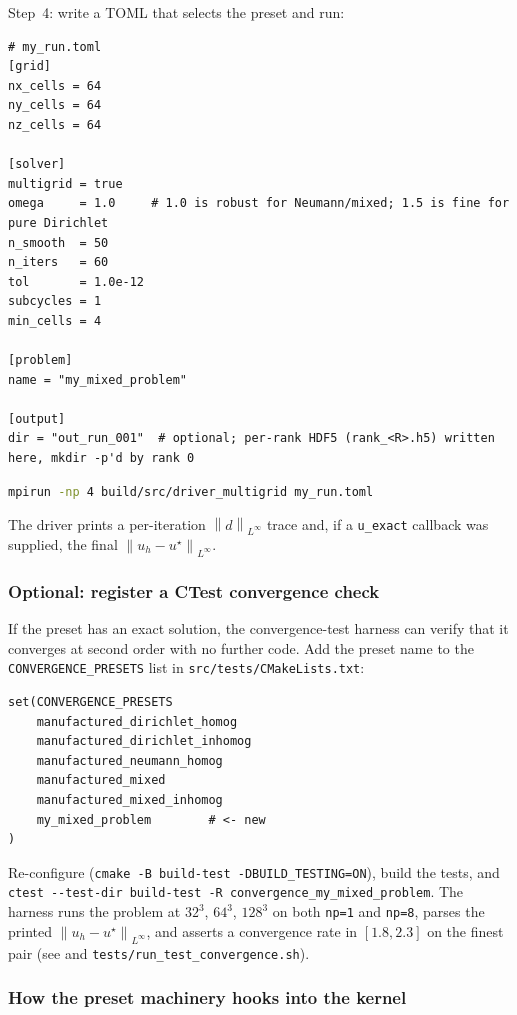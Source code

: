 \documentclass[11pt]{article}
\theoremstyle{definition}
\newcommand{\norm}[1]{\left\lVert #1 \right\rVert}
\newcommand{\Linf}{L^{\infty}}
\begin{document}
Step~4: write a TOML that selects the preset and run:
\begin{lstlisting}[language={}]
# my_run.toml
[grid]
nx_cells = 64
ny_cells = 64
nz_cells = 64

[solver]
multigrid = true
omega     = 1.0     # 1.0 is robust for Neumann/mixed; 1.5 is fine for pure Dirichlet
n_smooth  = 50
n_iters   = 60
tol       = 1.0e-12
subcycles = 1
min_cells = 4

[problem]
name = "my_mixed_problem"

[output]
dir = "out_run_001"  # optional; per-rank HDF5 (rank_<R>.h5) written here, mkdir -p'd by rank 0
\end{lstlisting}
\begin{lstlisting}[language=bash]
mpirun -np 4 build/src/driver_multigrid my_run.toml
\end{lstlisting}
The driver prints a per-iteration $\norm{d}_{\Linf}$ trace and, if a
\texttt{u\_exact} callback was supplied, the final
$\norm{u_{h} - u^{\star}}_{\Linf}$.

\subsubsection{Optional: register a CTest convergence check}

If the preset has an exact solution, the convergence-test harness can
verify that it converges at second order with no further code.  Add
the preset name to the \verb|CONVERGENCE_PRESETS| list in
\texttt{src/tests/CMakeLists.txt}:
\begin{lstlisting}[language={}]
set(CONVERGENCE_PRESETS
    manufactured_dirichlet_homog
    manufactured_dirichlet_inhomog
    manufactured_neumann_homog
    manufactured_mixed
    manufactured_mixed_inhomog
    my_mixed_problem        # <- new
)
\end{lstlisting}
Re-configure (\verb|cmake -B build-test -DBUILD_TESTING=ON|), build
the tests, and \verb|ctest --test-dir build-test -R convergence_my_mixed_problem|.
The harness runs the problem at $32^{3}$, $64^{3}$, $128^{3}$ on
both \texttt{np=1} and \texttt{np=8}, parses the printed
$\norm{u_{h} - u^{\star}}_{\Linf}$, and asserts a convergence rate in
$[1.8, 2.3]$ on the finest pair (see  and
\texttt{tests/run\_test\_convergence.sh}).

\subsubsection{How the preset machinery hooks into the kernel}\label{sec:preset-internals}
\end{document}
